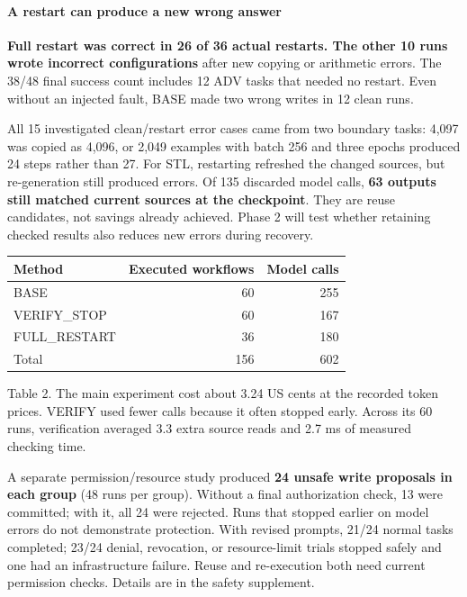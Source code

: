 \documentclass{article}
\renewcommand{\footnotesize}{\fontsize{9}{10}\selectfont}
\begin{document}
\paragraph{A restart can produce a new wrong answer}
\textbf{Full restart was correct in 26 of 36 actual restarts. The other 10 runs wrote incorrect configurations} after new copying or arithmetic errors. The 38/48 final success count includes 12 ADV tasks that needed no restart. Even without an injected fault, BASE made two wrong writes in 12 clean runs.

All 15 investigated clean/restart error cases came from two boundary tasks: 4,097 was copied as 4,096, or 2,049 examples with batch 256 and three epochs produced 24 steps rather than 27. For STL, restarting refreshed the changed sources, but re-generation still produced errors. Of 135 discarded model calls, \textbf{63 outputs still matched current sources at the checkpoint}. They are reuse candidates, not savings already achieved. Phase 2 will test whether retaining checked results also reduces new errors during recovery.

\begin{center}
\small
\setlength{\tabcolsep}{4pt}
\renewcommand{\arraystretch}{1.12}
\begin{tabular}{@{}lrr@{}}
\toprule
\textbf{Method} & \textbf{Executed workflows} & \textbf{Model calls} \\
\midrule
BASE & 60 & 255 \\
VERIFY\_STOP & 60 & 167 \\
FULL\_RESTART & 36 & 180 \\
Total & 156 & 602 \\
\bottomrule
\end{tabular}
\end{center}
{\footnotesize Table 2. The main experiment cost about 3.24 US cents at the recorded token prices. VERIFY used fewer calls because it often stopped early. Across its 60 runs, verification averaged 3.3 extra source reads and 2.7 ms of measured checking time.\par}

A separate permission/resource study produced \textbf{24 unsafe write proposals in each group} (48 runs per group). Without a final authorization check, 13 were committed; with it, all 24 were rejected. Runs that stopped earlier on model errors do not demonstrate protection. With revised prompts, 21/24 normal tasks completed; 23/24 denial, revocation, or resource-limit trials stopped safely and one had an infrastructure failure. Reuse and re-execution both need current permission checks. Details are in the safety supplement.
\end{document}
